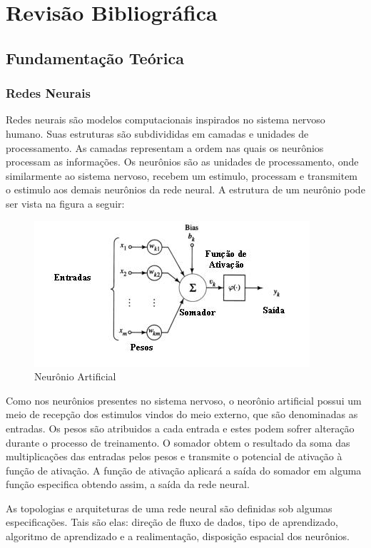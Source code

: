 \chapter{Revisão Bibliográfica} \label{cap2}
\section{Fundamentação Teórica}
\subsection{Redes Neurais}
Redes neurais são modelos computacionais inspirados no sistema nervoso humano. Suas estruturas são subdivididas em camadas e unidades de processamento. As camadas representam a ordem nas quais os neurônios processam as informações. Os neurônios são as unidades de processamento, onde similarmente ao sistema nervoso, recebem um estimulo, processam e transmitem o estimulo aos demais neurônios da rede neural. A estrutura de um neurônio pode ser vista na figura a seguir:
\begin{figure}[h]
	\centering
    \label{fig1}
    \vspace{3ex}%
	\includegraphics[scale=0.7]{pasta1_figuras/neuronio_artificial.jpg}
    \caption{Neurônio Artificial}
\end{figure}

Como nos neurônios presentes no sistema nervoso, o neorônio artificial possui um meio de recepção dos estimulos vindos do meio externo, que são denominadas as entradas. Os pesos são atribuidos a cada entrada e estes podem sofrer alteração durante o processo de treinamento. O somador obtem o resultado da soma das multiplicações das entradas pelos pesos e transmite o potencial de ativação à função de ativação. A função de ativação aplicará a saída do somador em alguma função especifica obtendo assim, a saída da rede neural.

As topologias e arquiteturas de uma rede neural são definidas sob algumas especificações. Tais são elas: direção de fluxo de dados, tipo de aprendizado, algoritmo de aprendizado e a realimentação, disposição espacial dos neurônios.


